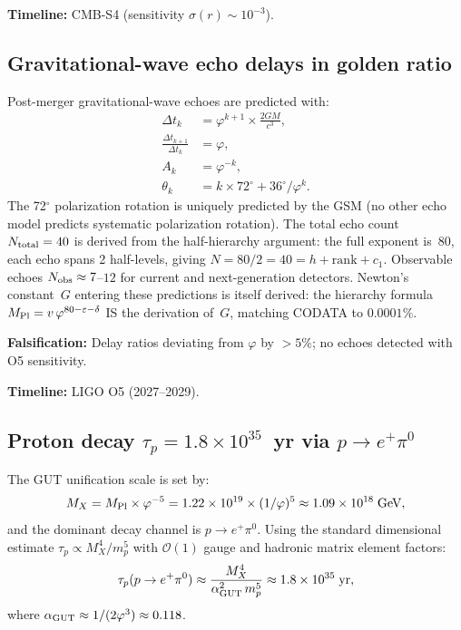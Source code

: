 \documentclass[aps,prd,twocolumn,superscriptaddress,nofootinbib,showpacs]{revtex4-2}
\newcommand{\Mpl}{M_{\rm Pl}}
\begin{document}
\textbf{Timeline:} CMB-S4 (sensitivity $\sigma(r) \sim 10^{-3}$).

\subsection{Gravitational-wave echo delays in golden ratio}
\label{sec:gwechoes}

Post-merger gravitational-wave echoes are predicted with:
\begin{align}
\Delta t_k &= \varphi^{k+1} \times \frac{2GM}{c^3}, \label{eq:echodelay} \\
\frac{\Delta t_{k+1}}{\Delta t_k} &= \varphi, \label{eq:echoratio} \\
A_k &= \varphi^{-k}, \label{eq:echoamp} \\
\theta_k &= k \times 72^\circ + 36^\circ/\varphi^k. \label{eq:echopol}
\end{align}
The 72$^\circ$ polarization rotation is uniquely predicted by the GSM
(no other echo model predicts systematic polarization rotation).
The total echo count $N_{\rm total} = 40$ is derived from the
half-hierarchy argument: the full exponent is~80, each echo spans 2
half-levels, giving $N = 80/2 = 40 = h + \text{rank} + c_1$.
Observable echoes $N_{\rm obs} \approx 7$--$12$ for current and
next-generation detectors.  Newton's constant~$G$ entering these
predictions is itself derived: the hierarchy formula
$\Mpl = v\,\varphi^{80-\varepsilon-\delta}$ IS the derivation of~$G$,
matching CODATA to $0.0001\%$.

\textbf{Falsification:} Delay ratios deviating from $\varphi$ by
${>}5\%$; no echoes detected with O5 sensitivity.

\textbf{Timeline:} LIGO O5 (2027--2029).

\subsection{Proton decay $\tau_p = 1.8 \times 10^{35}$~yr via
$p \to e^+\pi^0$}
\label{sec:protondecay}

The GUT unification scale is set by:
\begin{equation}
M_X = \Mpl \times \varphi^{-5} = 1.22 \times 10^{19} \times
(1/\varphi)^5 \approx 1.09 \times 10^{18}\;\text{GeV},
\label{eq:gutscale}
\end{equation}
and the dominant decay channel is $p \to e^+\pi^0$.  Using the
standard dimensional estimate $\tau_p \propto M_X^4/m_p^5$ with
$\mathcal{O}(1)$ gauge and hadronic matrix element factors:
\begin{equation}
\tau_p(p \to e^+\pi^0) \approx \frac{M_X^4}{\alpha_{\rm GUT}^2\,
m_p^5} \approx 1.8 \times 10^{35}\;\text{yr},
\label{eq:protondecay}
\end{equation}
where $\alpha_{\rm GUT} \approx 1/(2\varphi^3) \approx 0.118$.
\end{document}
